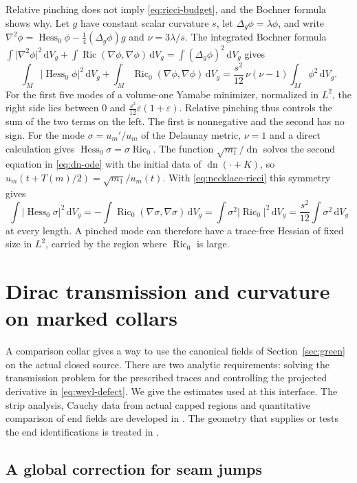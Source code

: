 \documentclass[11pt]{article}
\numberwithin{equation}{section}
\DeclareMathOperator{\Ric}{Ric}
\DeclareMathOperator{\Hess}{Hess}
\DeclareMathOperator{\dn}{dn}
\newcommand{\dd}{\mathrm{d}}
\newcommand{\e}{\varepsilon}
\newcommand{\abs}[1]{\lvert #1\rvert}
\newcommand{\dv}{\dd V_g}
\begin{document}
Relative pinching does not imply \eqref{eq:ricci-budget}, and the
Bochner formula shows why. Let \(g\) have constant scalar curvature
\(s\), let \(\Delta_g\phi=\lambda\phi\), and write
\(\nabla^2\phi=\Hess_0\phi-\tfrac14(\Delta_g\phi)g\) and
\(\nu=3\lambda/s\). The integrated Bochner formula
\(\int\abs{\nabla^2\phi}^2\,\dv+\int\Ric(\nabla\phi,\nabla\phi)\,\dv
=\int(\Delta_g\phi)^2\,\dv\) gives
\begin{equation}\label{eq:bochner-pinch}
 \int_M\abs{\Hess_0\phi}^2\,\dv
 +\int_M\Ric_0(\nabla\phi,\nabla\phi)\,\dv
 =\frac{s^2}{12}\,\nu(\nu-1)\int_M\phi^2\,\dv .
\end{equation}
For the first five modes of a volume-one Yamabe minimizer, normalized
in \(L^2\), the right side lies between \(0\) and
\(\tfrac{s^2}{12}\e(1+\e)\). Relative pinching thus controls the sum
of the two terms on the left. The first is nonnegative and the second
has no sign. For the mode \(\sigma=u_m'/u_m\) of the Delaunay metric,
\(\nu=1\) and a direct calculation gives
\(\Hess_0\sigma=\sigma\Ric_0\). The function \(\sqrt{m_1}/\dn\) solves
the second equation in \eqref{eq:dn-ode} with the initial data of
\(\dn(\cdot+K)\), so \(u_m(t+T(m)/2)=\sqrt{m_1}/u_m(t)\). With
\eqref{eq:necklace-ricci} this symmetry gives
\[
 \int\abs{\Hess_0\sigma}^2\,\dv
 =-\int\Ric_0(\nabla\sigma,\nabla\sigma)\,\dv
 =\int\sigma^2\abs{\Ric_0}^2\,\dv=\frac{s^2}{12}\int\sigma^2\,\dv
\]
at every length. A pinched mode can therefore have a trace-free
Hessian of fixed size in \(L^2\), carried by the region where
\(\Ric_0\) is large.

\section{Dirac transmission and curvature on marked collars}\label{sec:collar-transmission}

A comparison collar gives a way to use the canonical fields of
Section~\ref{sec:green} on the actual closed source. There are two
analytic requirements: solving the transmission problem for the
prescribed traces and controlling the projected derivative in
\eqref{eq:weyl-defect}. We give the estimates used at this interface.
The strip analysis, Cauchy data from actual capped regions and
quantitative comparison of end fields are developed in
\cite{Baker2026DiracTransmission}. The geometry that supplies or tests
the end identifications is treated in
\cite{Baker2026MarkedNecks,Baker2026MarkedLimits}.

\subsection{A global correction for seam jumps}
\end{document}
